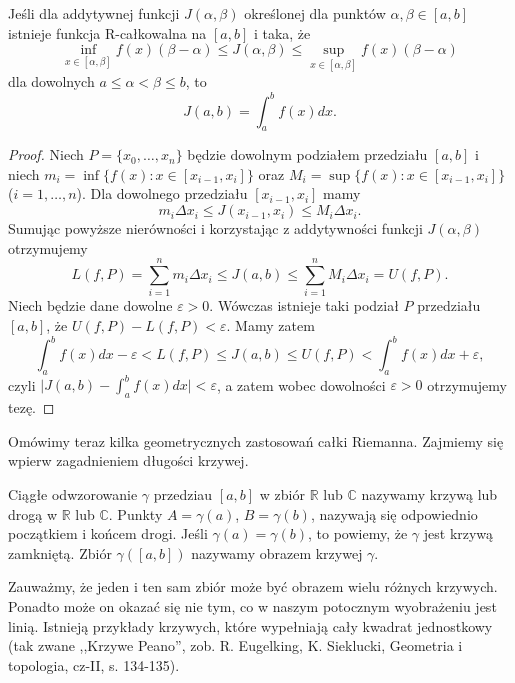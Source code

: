 \documentclass[leqno]{article}
\begin{document}
\begin{justify}
\begin{theorem}
{
    Jeśli dla addytywnej funkcji $J(\alpha, \beta)$ określonej dla punktów $\alpha, \beta \in [a,b]$ istnieje
    funkcja R-całkowalna na $[a,b]$ i taka, że 
    \[
        \inf_{x \in [\alpha, \beta]} f(x)(\beta - \alpha) \leqslant J(\alpha, \beta) \leqslant \sup_{x \in [\alpha, \beta]} f(x)(\beta - \alpha)
    \]
    dla dowolnych $a \leqslant \alpha < \beta \leqslant b$, to
    \[
        J(a,b) = \int_{a}^{b}f(x)dx.
    \]
}
\end{theorem}

\begin{proof}
    Niech $ P = \{x_0, \ldots, x_n\}$ będzie dowolnym podziałem przedziału $[a,b]$ i niech
    $m_i = \inf\{f(x) : x \in [x_{i-1}, x_i]\}$ oraz $M_i = \sup\{f(x) : x \in [x_{i-1}, x_i]\}$ ($i = 1, \ldots, n$).
    Dla dowolnego przedziału $[x_{i-1}, x_i]$ mamy 
    \[
        m_i \Delta x_i \leqslant J(x_{i-1}, x_i) \leqslant M_i \Delta x_i.
    \]
    Sumując powyższe nierówności i korzystając z addytywności funkcji $J(\alpha, \beta)$ otrzymujemy
    \[
        L(f, P) = \sum_{i=1}^{n}m_i \Delta x_i \leqslant J(a,b) \leqslant \sum_{i = 1}^{n}M_i \Delta x_i = U(f, P).
    \]
    Niech będzie dane dowolne $\varepsilon > 0$. Wówczas istnieje taki podział $P$ przedziału $[a,b]$, że
    $U(f, P) - L(f, P) < \varepsilon$. Mamy zatem
    \[
        \int_{a}^{b}f(x)dx - \varepsilon < L(f, P) \leqslant J(a,b) \leqslant U(f, P) < \int_{a}^{b}f(x)dx + \varepsilon,
    \]
    czyli $\big|J(a,b) - \int_{a}^{b}f(x)dx \big| < \varepsilon$, a zatem wobec dowolności $\varepsilon > 0$ otrzymujemy tezę.
\end{proof}

Omówimy teraz kilka geometrycznych zastosowań całki Riemanna. Zajmiemy się wpierw zagadnieniem długości krzywej.

\begin{defn}
    Ciągłe odwzorowanie $\gamma$ przedziau $[a,b]$ w zbiór $\mathbb{R}$ lub $\mathbb{C}$ nazywamy krzywą
    lub drogą w $\mathbb{R}$ lub $\mathbb{C}$. Punkty $A = \gamma(a)$, $B = \gamma(b)$, nazywają się odpowiednio
    początkiem i końcem drogi. Jeśli $\gamma(a) = \gamma(b)$, to powiemy, że $\gamma$ jest krzywą zamkniętą.
    Zbiór $\gamma([a,b])$ nazywamy obrazem krzywej $\gamma$. 
\end{defn}

\begin{uwaga}
    Zauważmy, że jeden i ten sam zbiór może być obrazem wielu różnych krzywych.
    Ponadto może on okazać się nie tym, co w naszym potocznym wyobrażeniu jest linią.
    Istnieją przykłady krzywych, które wypełniają cały kwadrat jednostkowy (tak zwane ,,Krzywe Peano'',
    zob. R. Eugelking, K. Sieklucki, Geometria i topologia, cz-II, s. 134-135).
\end{uwaga}


\end{justify}
\end{document}

